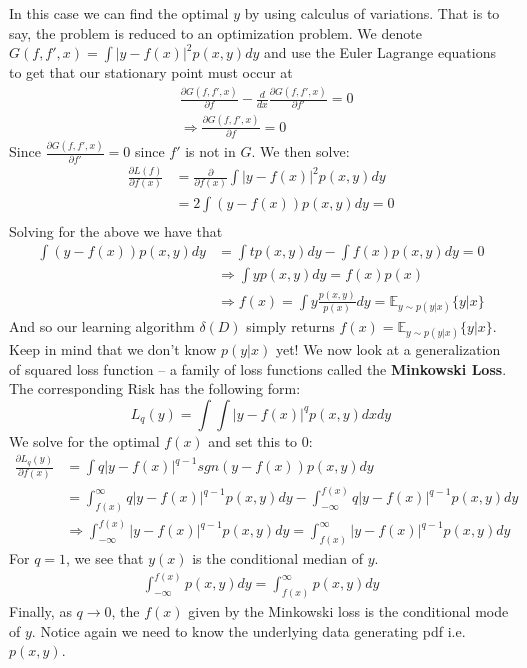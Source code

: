 \documentclass[]{article}
\theoremstyle{mattstyle}
\theoremstyle{definition}
\begin{document}
In this case we can find the optimal $y$ by using calculus of variations. That is to say, the problem is reduced to an optimization problem. We denote $G(f, f', x) = \int | y - f(x) |^2 p(x, y) dy$ and use the Euler Lagrange equations to get that our stationary point must occur at 
\begin{align*}
&\frac{\partial G(f, f', x)}{\partial f} - \frac{d}{dx}\frac{\partial G(f, f', x)}{\partial f'} = 0\\
&\Rightarrow \frac{\partial G(f, f', x)}{\partial f}=0
\end{align*}
Since $\frac{\partial G(f, f', x)}{\partial f'}=0$ since $f'$ is not in $G$. We then solve:
\begin{align*}
\frac{\partial L(f)}{\partial f(x)} &= \frac{\partial}{\partial f(x)}\int | y - f(x) |^2 p(x, y) dy\\
&=2 \int (y - f(x)) p(x, y) dy = 0\\
\end{align*}
Solving for the above we have that
\begin{align*}
\int (y - f(x)) p(x, y) dy &= \int t p(x, y) dy - \int f(x) p(x, y) dy = 0\\
&\Rightarrow \int y p(x, y) dy =  f(x)p(x) \\
&\Rightarrow f(x) = \int y \frac{p(x, y)}{p(x)} dy = \mathbb{E}_{y \sim p(y|x)}\{y|x\}
\end{align*}
And so our learning algorithm $\delta(D)$ simply returns $f(x) = \mathbb{E}_{y \sim p(y|x)}\{y|x\}$. Keep in mind that we don't know $p(y|x)$ yet! We now look at a generalization of squared loss function -- a family of loss functions called the \textbf{Minkowski Loss}. The corresponding Risk has the following form:
\begin{equation}
L_q(y) = \int\int |y-f(x)|^q p(x,y)dxdy
\end{equation}
We solve for the optimal $f(x)$ and set this to 0:
\begin{align}
\frac{\partial L_q(y)}{\partial f(x)} &= \int q|y-f(x)|^{q-1} sgn(y-f(x)) p(x,y)dy\\
&= \int_{f(x)}^{\infty} q|y-f(x)|^{q-1}p(x,y)dy-\int_{-\infty}^{f(x)} q|y-f(x)|^{q-1}p(x,y)dy\\
&\Rightarrow \int_{-\infty}^{f(x)} |y-f(x)|^{q-1}p(x,y)dy = \int_{f(x)}^{\infty} |y-f(x)|^{q-1}p(x,y)dy
\end{align}
For $q=1$, we see that $y(x)$ is the conditional median of $y$.
\begin{align}
\int_{-\infty}^{f(x)} p(x,y)dy = \int_{f(x)}^{\infty} p(x,y)dy
\end{align}
Finally, as $q \rightarrow 0$, the $f(x)$ given by the Minkowski loss is the conditional mode of $y$. Notice again we need to know the underlying data generating pdf i.e. $p(x, y)$.
\end{document}
